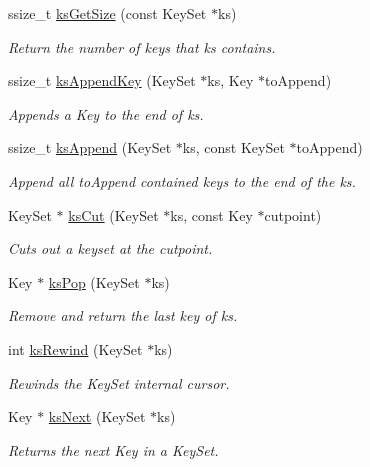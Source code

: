 \begin{DoxyCompactItemize}
ssize\+\_\+t \mbox{\hyperlink{group__keyset_ga7474ad6b0a0fa969dbdf267ba5770eee}{ks\+Get\+Size}} (const Key\+Set $\ast$ks)
\begin{DoxyCompactList}\small\item\em Return the number of keys that {\ttfamily ks} contains. \end{DoxyCompactList}\item 
ssize\+\_\+t \mbox{\hyperlink{group__keyset_gaa5a1d467a4d71041edce68ea7748ce45}{ks\+Append\+Key}} (Key\+Set $\ast$ks, Key $\ast$to\+Append)
\begin{DoxyCompactList}\small\item\em Appends a Key to the end of {\ttfamily ks}. \end{DoxyCompactList}\item 
ssize\+\_\+t \mbox{\hyperlink{group__keyset_ga21eb9c3a14a604ee3a8bdc779232e7b7}{ks\+Append}} (Key\+Set $\ast$ks, const Key\+Set $\ast$to\+Append)
\begin{DoxyCompactList}\small\item\em Append all {\ttfamily to\+Append} contained keys to the end of the {\ttfamily ks}. \end{DoxyCompactList}\item 
Key\+Set $\ast$ \mbox{\hyperlink{group__keyset_ga6b00cf82b59af4d883a9bad6cf4a4a4a}{ks\+Cut}} (Key\+Set $\ast$ks, const Key $\ast$cutpoint)
\begin{DoxyCompactList}\small\item\em Cuts out a keyset at the cutpoint. \end{DoxyCompactList}\item 
Key $\ast$ \mbox{\hyperlink{group__keyset_gae42530b04defb772059de0600159cf69}{ks\+Pop}} (Key\+Set $\ast$ks)
\begin{DoxyCompactList}\small\item\em Remove and return the last key of {\ttfamily ks}. \end{DoxyCompactList}\item 
int \mbox{\hyperlink{group__keyset_gabe793ff51f1728e3429c84a8a9086b70}{ks\+Rewind}} (Key\+Set $\ast$ks)
\begin{DoxyCompactList}\small\item\em Rewinds the Key\+Set internal cursor. \end{DoxyCompactList}\item 
Key $\ast$ \mbox{\hyperlink{group__keyset_ga317321c9065b5a4b3e33fe1c399bcec9}{ks\+Next}} (Key\+Set $\ast$ks)
\begin{DoxyCompactList}\small\item\em Returns the next Key in a Key\+Set. \end{DoxyCompactList}\item 

\end{DoxyCompactItemize}
